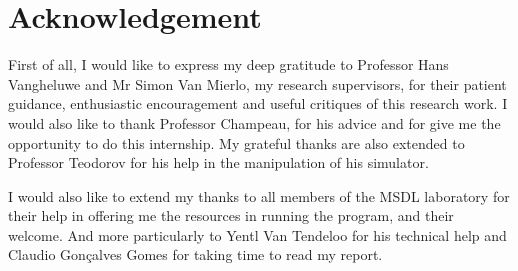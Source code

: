
\chapter*{Acknowledgement}
First of all, I would like to express my deep gratitude to Professor Hans Vangheluwe and Mr Simon Van Mierlo, my research supervisors, for their patient guidance, enthusiastic encouragement and useful critiques of this research work. I would also like to thank Professor Champeau, for his advice and for give me the opportunity to do this internship. My grateful thanks are also extended to Professor Teodorov for his help in the manipulation of his simulator.

I would also like to extend my thanks to all members of the MSDL laboratory for their help in offering me the resources in running the program, and their welcome. And more particularly to Yentl Van Tendeloo for his technical help and Claudio Gonçalves Gomes for taking time to read my report.


\newpage

